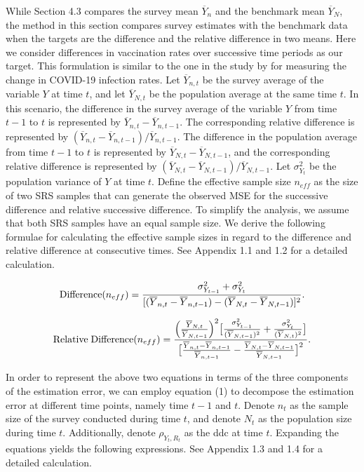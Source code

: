 \documentclass{article}
\begin{document}
While Section 4.3 compares the survey mean $\overline{Y}_n$ and the benchmark mean $\overline{Y}_N$, the method in this section compares survey estimates with the benchmark data when the targets are the difference and the relative difference in two means. Here we consider differences in vaccination rates over successive time periods as our target. This formulation is similar to the one in the study by \cite{Dempsey2020} for measuring the change in COVID-19 infection rates. Let $\overline{Y}_{n,t}$ be the survey average of the variable $Y$ at time $t$, and let $\overline{Y}_{N,t}$ be the population average at the same time $t$. In this scenario, the difference in the survey average of the variable $Y$ from time $t-1$ to $t$ is represented by $\overline{Y}_{n,t} - \overline{Y}_{n,t-1}$. The corresponding relative difference is represented by $(\overline{Y}_{n,t} - \overline{Y}_{n,t-1})\slash{\overline{Y}_{n,t-1}}$. The difference in the population average from time $t-1$ to $t$ is represented by $\overline{Y}_{N,t} - \overline{Y}_{N,t-1}$, and the corresponding relative difference is represented by $(\overline{Y}_{N,t} - \overline{Y}_{N,t-1})\slash{\overline{Y}_{N,t-1}}$. Let $\sigma_{Y_t}^2$ be the population variance of $Y$ at time $t$. Define the effective sample size $n_{eff}$ as the size of two SRS samples that can generate the observed MSE for the successive difference and relative successive difference. To simplify the analysis, we assume that both SRS samples have an equal sample size. We derive the following formulae for calculating the effective sample sizes in regard to the difference and relative difference at consecutive times. See Appendix 1.1 and 1.2 for a detailed calculation.

\begin{align}
    {\rm Difference}(n_{eff}) = \frac{\sigma_{Y_{t-1}}^2 + \sigma_{Y_t}^2}{[(\overline{Y}_{n,t} - \overline{Y}_{n,t-1})-(\overline{Y}_{N,t} - \overline{Y}_{N,t-1})]^2}.
\end{align}

\begin{align}
{\rm Relative \; Difference}(n_{eff}) = \frac{\Big(\frac{\overline{Y}_{N,t}}{\overline{Y}_{N,t-1}}\Big)^2\big[\frac{\sigma_{Y_{t-1}}^2}{(\overline{Y}_{N,t-1})^2} + \frac{\sigma_{Y_t}^2}{(\overline{Y}_{N,t})^2}\big]} {\big[\frac{\overline{Y}_{n,t} - \overline{Y}_{n,t-1}}{\overline{Y}_{n,t-1}} - \frac{\overline{Y}_{N,t} - \overline{Y}_{N,t-1}}{\overline{Y}_{N,t-1}}\big]^2}.
\end{align}

\noindent In order to represent the above two equations in  terms of the three components of the estimation error, we can employ equation (1) to decompose the estimation error at different time points, namely time $t-1$ and $t$. Denote $n_t$ as the sample size of the survey conducted during time $t$, and denote $N_t$ as the population size during time $t$. Additionally, denote ${\rho}_{Y_t, R_t}$ as the ddc at time $t$. Expanding the equations yields the following expressions. See Appendix 1.3 and 1.4 for a detailed calculation.
\end{document}
